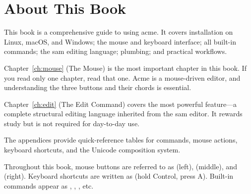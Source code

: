 \section{About This Book}

This book is a comprehensive guide to using acme.  It covers
installation on Linux, macOS, and Windows; the mouse and keyboard
interface; all built-in commands; the sam editing language; plumbing;
and practical workflows.

Chapter~\ref{ch:mouse} (The Mouse) is the most important chapter in
this book.  If you read only one chapter, read that one.  Acme is a
mouse-driven editor, and understanding the three buttons and their
chords is essential.

Chapter~\ref{ch:edit} (The Edit Command) covers the most powerful
feature---a complete structural editing language inherited from the sam
editor.  It rewards study but is not required for day-to-day use.

The appendices provide quick-reference tables for commands, mouse
actions, keyboard shortcuts, and the Unicode composition system.

Throughout this book, mouse buttons are referred to as 
(left),  (middle), and  (right).  Keyboard
shortcuts are written as  (hold Control, press A).
Built-in commands appear as , , , etc.
